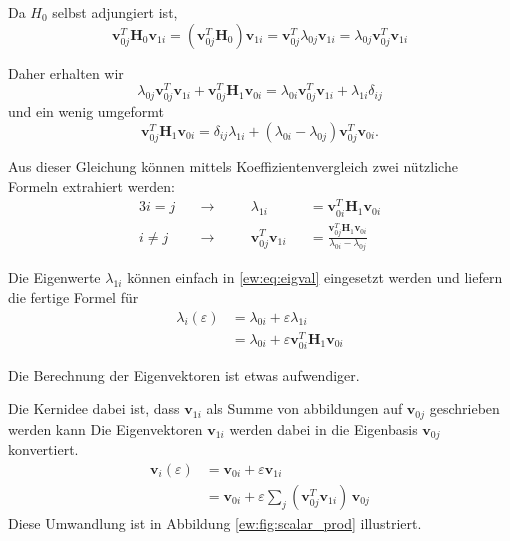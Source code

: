 Da $H_0$ selbst adjungiert ist,
\begin{equation}
    \bm v_{0j}^T \bm H_0 \bm v_{1i}
    =
    \left( \bm v_{0j}^T \bm H_0 \right) \bm v_{1i}
    =
    \bm v_{0j}^T \lambda_{0j} \bm v_{1i}
    =
    \lambda_{0j} \bm v_{0j}^T \bm v_{1i}
\end{equation}

Daher erhalten wir
\begin{equation}
    \lambda_{0j} \bm v_{0j}^T \bm v_{1i} + 
    \bm v_{0j}^T \bm H_1 \bm v_{0i}
    =
    \lambda_{0i} \bm v_{0j}^T \bm v_{1i} +
    \lambda_{1i} \delta_{ij}
\end{equation}
und ein wenig umgeformt
\begin{equation}
    \bm v_{0j}^T \bm H_1 \bm v_{0i}
    =
    \delta_{ij} \lambda_{1i} + 
    ( \lambda_{0i} - \lambda_{0j} )
    \bm v_{0j}^T  \bm v_{0i} .
\end{equation}

Aus dieser Gleichung können mittels Koeffizientenvergleich zwei nützliche Formeln extrahiert werden:
\begin{alignat}{3}
    i = j \quad & \rightarrow  \quad && \lambda_{1i}&& = \bm v_{0i}^T \bm H_1 \bm v_{0i} \\
    i \neq j \quad & \rightarrow \quad && \bm v_{0j}^T \bm v_{1i}&& = \frac{\bm v_{0j}^T \bm H_1 \bm v_{0i}}{\lambda_{0i} - \lambda_{0j}} 
\end{alignat} \label{ew:eq:f2}

Die Eigenwerte $\lambda_{1i}$ können einfach in \ref{ew:eq:eigval} eingesetzt werden und liefern die fertige Formel für   
\begin{align*}
    \lambda_i(\varepsilon)
    &=
    \lambda_{0i} + \varepsilon \lambda_{1i} \\
    &=
    \lambda_{0i} + \varepsilon \bm v_{0i}^T \bm H_1 \bm v_{0i}
\end{align*}

Die Berechnung der Eigenvektoren ist etwas aufwendiger.


Die Kernidee dabei ist, dass $\bm v_{1i}$ als Summe von abbildungen auf $\bm v_{0j}$ geschrieben werden kann
Die Eigenvektoren $\bm v_{1i}$ werden dabei in die Eigenbasis $\bm v_{0j}$ konvertiert. %
\begin{align*}
    \bm v_i(\varepsilon)
    &=
    \bm v_{0i} + \varepsilon \bm v_{1i} \\
    &=
    \bm v_{0i} + \varepsilon \sum_{j} ( \bm v_{0j}^T \bm v_{1i}) \, \bm v_{0j}
\end{align*}
Diese Umwandlung ist in Abbildung \ref{ew:fig:scalar_prod} illustriert.

